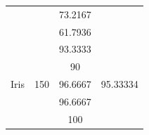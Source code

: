 \documentclass[12pt]{article}
\begin{document}
\begin{table}[H]
\begin{tabular}{|c|c|c|c|}
		&                         & 73.2167                                                                                          &                             \\ \cline{3-3}
		&                         & 61.7936                                                                                          &                             \\ \hline
		\multirow{5}{*}{Iris}                & \multirow{5}{*}{150}    & 93.3333                                                                                          & \multirow{5}{*}{95.33334}   \\ \cline{3-3}
		&                         & 90                                                                                               &                             \\ \cline{3-3}
		&                         & 96.6667                                                                                          &                             \\ \cline{3-3}
		&                         & 96.6667                                                                                          &                             \\ \cline{3-3}
		&                         & 100                                                                                              &                             \\ \hline
	\end{tabular}
\end{table}
\end{document}

